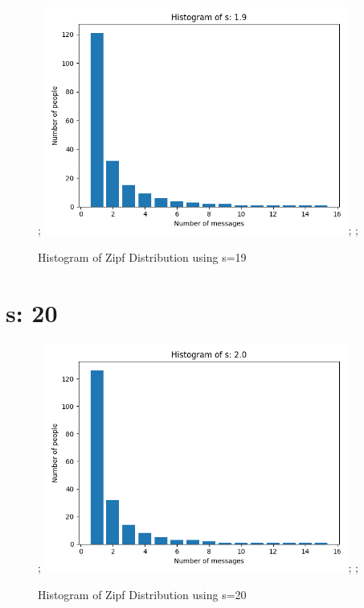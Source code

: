 \documentclass{article}
\begin{document}
\begin{figure}[H] \centering; \includegraphics[width=10cm]{imgs/histogram-19.png}; \label{fig:hist-19}; \caption{Histogram of Zipf Distribution using s=19} \end{figure}


\section{s: 20}

\begin{figure}[H] \centering; \includegraphics[width=10cm]{imgs/histogram-20.png}; \label{fig:hist-20}; \caption{Histogram of Zipf Distribution using s=20} \end{figure}


\end{document}
